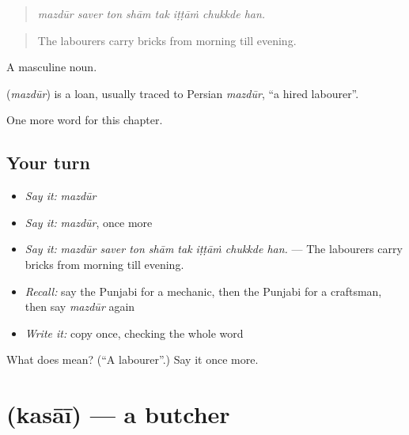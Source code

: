 \begin{quote}
       
\end{quote}

\begin{quote}
\emph{mazdūr saver ton shām tak iṭṭāṁ chukkde han.}
\end{quote}

\begin{quote}
The labourers carry bricks from morning till evening.
\end{quote}

A masculine noun.

\begin{cousinweb}
\textbf{} (\emph{mazdūr}) is a loan, usually traced to Persian \emph{mazdūr}, \textquotedblleft{}a hired labourer\textquotedblright{}.
\end{cousinweb}

\begin{grammarlens}[title={What you've built}]
One more word for this chapter.
\end{grammarlens}

\subsection*{Your turn}
\begin{itemize}
\raggedright
  \item \emph{Say it:} \emph{mazdūr}
  \item \emph{Say it:} \emph{mazdūr}, once more
  \item \emph{Say it:} \emph{mazdūr saver ton shām tak iṭṭāṁ chukkde han.} — The labourers carry bricks from morning till evening.
  \item \emph{Recall:} say the Punjabi for a mechanic, then the Punjabi for a craftsman, then say \emph{mazdūr} again
  \item \emph{Write it:} copy \textbf{} once, checking the whole word
\end{itemize}

\begin{tcolorbox}[breakable,colback=teal!4,colframe=teal!35!black,title={Before you move on}]
What does  mean? (\textquotedblleft{}A labourer\textquotedblright{}.) Say it once more.
\end{tcolorbox}
\section[\texorpdfstring{\pa{ਕਸਾਈ} (kasāī)}{ਕਸਾਈ (kasāī)}]{ (kasāī) — a butcher}

